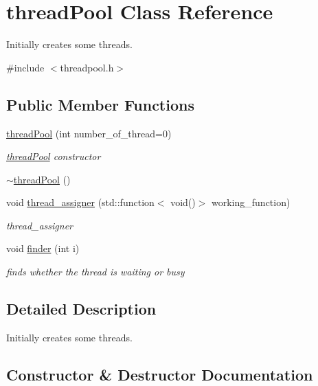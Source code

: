 \hypertarget{classthread_pool}{}\section{thread\+Pool Class Reference}
\label{classthread_pool}


Initially creates some threads.  




{\ttfamily \#include $<$threadpool.\+h$>$}

\subsection*{Public Member Functions}
\begin{DoxyCompactItemize}
\item 
\hyperlink{classthread_pool_aa70c5f6a5c0e985ec686d6c2232320ca}{thread\+Pool} (int number\+\_\+of\+\_\+thread=0)
\begin{DoxyCompactList}\small\item\em \hyperlink{classthread_pool}{thread\+Pool} constructor \end{DoxyCompactList}\item 
\hyperlink{classthread_pool_a92783539a58d307dfbcdc21c42f54be2}{$\sim$thread\+Pool} ()
\item 
void \hyperlink{classthread_pool_aec8f106624251d37b64afee8d5ed15f5}{thread\+\_\+assigner} (std\+::function$<$ void()$>$ working\+\_\+function)
\begin{DoxyCompactList}\small\item\em thread\+\_\+assigner \end{DoxyCompactList}\item 
void \hyperlink{classthread_pool_a86814709a56b62382cb7e1ebdbdf1ba5}{finder} (int i)
\begin{DoxyCompactList}\small\item\em finds whether the thread is waiting or busy \end{DoxyCompactList}\end{DoxyCompactItemize}


\subsection{Detailed Description}
Initially creates some threads. 

\subsection{Constructor \& Destructor Documentation}
